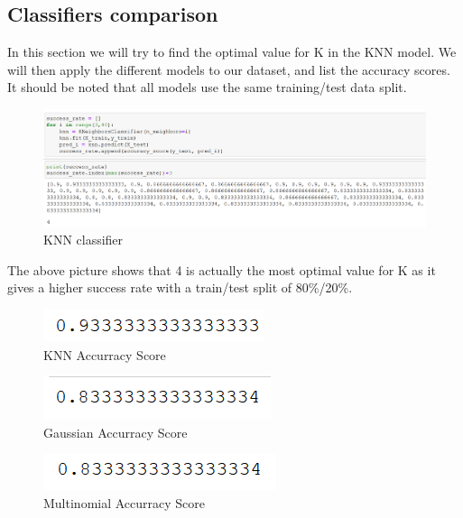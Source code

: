\documentclass{article}
\begin{document}
\subsection{Classifiers comparison}
In this section we will try to find the optimal value for K in the KNN model. We will then apply the different models to our dataset, and list the accuracy scores. It should be noted that all models use the same training/test data split.



\begin{figure}[!h]
  \caption{KNN classifier}
  \centering
      \includegraphics[width=\textwidth]{knnIris.png}
\end{figure}
\FloatBarrier

\noindent The above picture shows that 4 is actually the most optimal value for K as it gives a higher success rate with a train/test split of 80\%/20\%. 



\begin{figure}[!h]
  \caption{KNN Accurracy Score}
  \centering
      \includegraphics[scale=0.7]{successIris.png}
\end{figure}


\begin{figure}[!h]
  \centering
  \caption{Gaussian Accurracy Score}
    \includegraphics[scale=0.7]{GaussianIris.png}
\end{figure}


\begin{figure}[!h]
  \caption{Multinomial Accurracy Score}
  \centering
    \includegraphics[scale=0.7]{multiIris.png}
\end{figure}
\end{document}
